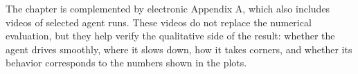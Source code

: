 The chapter is complemented by electronic Appendix A, which also includes videos of selected agent runs. These videos do not replace the numerical evaluation, but they help verify the qualitative side of the result: whether the agent drives smoothly, where it slows down, how it takes corners, and whether its behavior corresponds to the numbers shown in the plots.

\FloatBarrier
